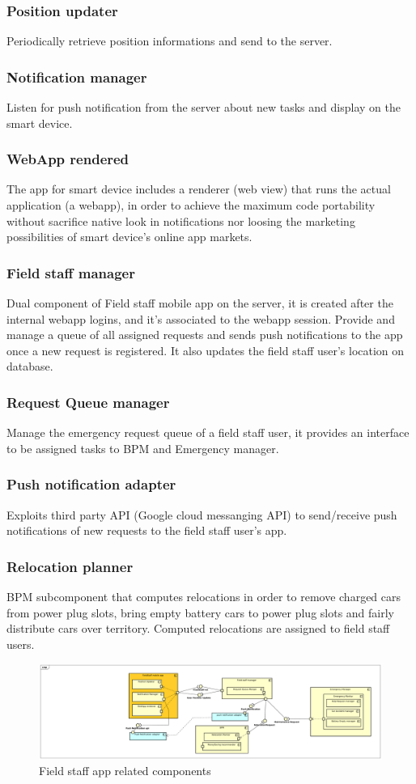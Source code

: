 \documentclass[english]{article}
\begin{document}
		\subsubsection{Position updater}
		Periodically retrieve position informations and send to the server.
		\subsubsection{Notification manager}
		Listen for push notification from the server about new tasks and display on the smart device.
		\subsubsection{WebApp rendered}
		The app for smart device includes a renderer (web view) that runs the actual application (a webapp), in order to achieve the maximum code portability without sacrifice native look in notifications nor loosing the marketing possibilities of smart device's online app markets.
	\subsubsection{Field staff manager}
	Dual component of Field staff mobile app on the server, it is created after the internal webapp logins, and it's associated to the webapp session. Provide and manage a queue of all assigned requests and sends push notifications to the app once a new request is registered. It also updates the field staff user's location on database.
		\subsubsection{Request Queue manager}
		Manage the emergency request queue of a field staff user, it provides an interface to be assigned tasks to BPM and Emergency manager.
	\subsubsection{Push notification adapter}
	Exploits third party API (Google cloud messanging API) to send/receive push notifications of new requests to the field staff user's app.
	\subsubsection{Relocation planner }
	BPM subcomponent that computes relocations in order to remove charged cars from power plug slots, bring empty battery cars to power plug slots and fairly distribute cars over territory. Computed relocations are assigned to field staff users.
	\begin{figure}[H]
		\centering
		\includegraphics[scale=0.21]{./ComponentDiagrams/FieldStaff.pdf}%
		\caption{Field staff app related components}
	\end{figure}
	
\end{document}
